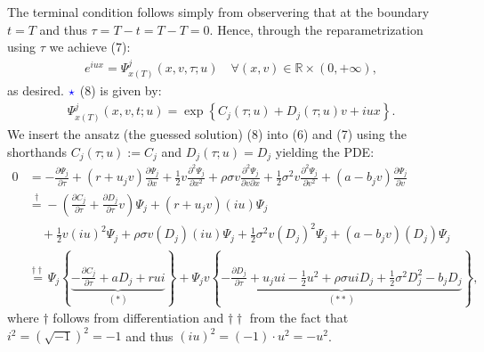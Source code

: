 \documentclass[12pt]{article}
\numberwithin{equation}{section}
\newcommand{\lc}{\left\{}
\newcommand{\rc}{\right\}}
\begin{document}
The terminal condition follows simply from observering that at the boundary $t=T$
and thus $\tau=T-t=T-T=0$. Hence, through the reparametrization using $\tau$ we
achieve (7):
\begin{align*}
    e^{iux}=\Psi_{x(T)}^j(x,v,\tau;u) \quad \forall (x, v) \in \mathbb{R} \times (0, +\infty),
\end{align*}
as desired.
\newpage
$\textcolor{blue}{\star}$ (8) is given by:
\begin{align*}
    \Psi_{x(T)}^j(x,v,t;u)=\exp \lc C_j (\tau; u) + D_j (\tau; u)v + i  u x \rc.
\end{align*}
We insert the ansatz (the guessed solution) (8) into (6) and (7) using the shorthands
$C_j (\tau; u):=C_j$ and $D_j (\tau; u)=D_j$ yielding the PDE:
\begin{align*}
    0&=-\frac{\partial \Psi_j}{\partial \tau}+(r+u_jv)\frac{\partial \Psi_j}{\partial x}+
    \frac{1}{2}v\frac{\partial^2 \Psi_j}{\partial x^2}+\rho\sigma v \frac{\partial^2 \Psi_j}{\partial v \partial x}+
    \frac{1}{2}\sigma^2v \frac{\partial^2 \Psi_j}{\partial v^2}+(a-b_j v) \frac{\partial \Psi_j}{\partial v}\\
    &\overset{\dagger}{=}-\left( \frac{\partial  C_j}{\partial \tau}+ \frac{\partial D_j}{\partial \tau}v\right)\Psi_j +(r+u_jv)(iu) \Psi_j\\&\quad+ \frac{1}{2}v(iu)^2\Psi_j+\rho\sigma v(D_j)(iu)\Psi_j+
    \frac{1}{2}\sigma^2v (D_j)^2\Psi_j+(a-b_j v)( D_j)\Psi_j\\
    &\overset{\dagger\dagger}{=} \Psi_j \lc \underbrace{ -\frac{\partial C_j}{\partial \tau} +aD_j+rui}_{(*)} \rc + \Psi_j v \lc\underbrace{ -\frac{\partial D_j}{\partial \tau}+u_jui-\frac{1}{2}u^2+\rho\sigma u i D_j+\frac{1}{2}\sigma^2 D_j^2 - b_jD_j}_{(**)} \rc,
\end{align*}
where $\dagger$ follows from differentiation and
$\dagger \dagger$ from the fact that $i^2= (\sqrt{-1})^2=-1$ and thus
$(iu)^2=(-1 )\cdot u^2=-u^2$.
\end{document}
